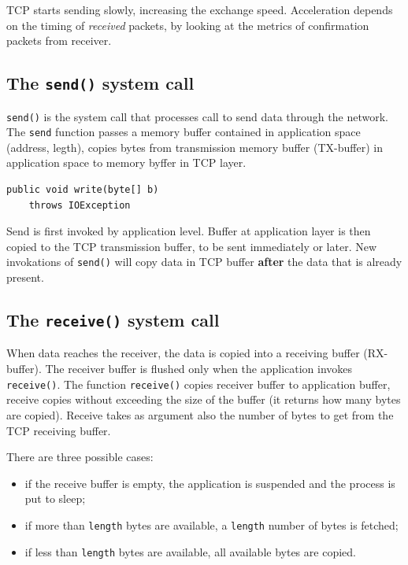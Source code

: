 \documentclass[a4paper, 11pt]{report}
\begin{document}
TCP starts sending slowly, increasing the exchange speed. Acceleration depends
on the timing of \emph{received} packets, by looking at the metrics of
confirmation packets from receiver.

\subsection{The \texttt{send()} system call}

\texttt{send()} is the system call that processes call to send data through the
network. The \texttt{send} function passes a memory buffer contained in
application space (address, legth), copies bytes from transmission memory
buffer (TX-buffer) in application space to memory byffer in TCP layer.

\begin{lstlisting}
public void write(byte[] b)
	throws IOException
\end{lstlisting}

Send is first invoked by application level. Buffer at application layer is then
copied to the TCP transmission buffer, to be sent immediately or later. New
invokations of \texttt{send()} will copy data in TCP buffer \textbf{after} the
data that is already present. 

\subsection{The \texttt{receive()} system call}

When data reaches the receiver, the data is copied into a receiving buffer
(RX-buffer). The receiver buffer is flushed only when the application invokes
\texttt{receive()}. The function \texttt{receive()} copies receiver buffer to
application buffer, receive copies without exceeding the size of the buffer (it
returns how many bytes are copied). Receive takes as argument also the number
of bytes to get from the TCP receiving buffer.

There are three possible cases:

\begin{itemize}
	\item if the receive buffer is empty, the application is suspended and
		the process is put to sleep;
	\item if more than \texttt{length} bytes are available, a
		\texttt{length} number of bytes is fetched;
	\item if less than \texttt{length} bytes are available, all available
		bytes are copied.
\end{itemize}
\end{document}
